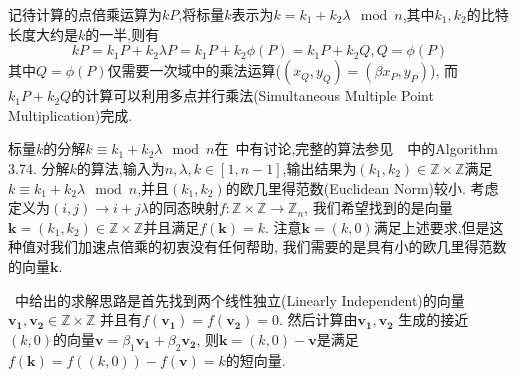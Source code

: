 \documentclass{article}
\newcommand{\Z}{\mathbb{Z}}
\begin{document}
记待计算的点倍乘运算为$kP$,将标量$k$表示为$k=k_1+k_2\lambda \mod n$,其中$k_1, k_2$的比特长度大约是$k$的一半,则有
$$kP = k_1P + k_2\lambda P = k_1P + k_2\phi(P) = k_1 P + k_2 Q, Q = \phi(P)$$
其中$Q=\phi(P)$仅需要一次域中的乘法运算($(x_Q, y_Q) = (\beta x_P, y_P)$),
而$k_1 P + k_2 Q$的计算可以利用多点并行乘法(Simultaneous Multiple Point Multiplication)完成.

标量$k$的分解$k \equiv k_1+k_2\lambda \mod n$在~\cite{glv01}中有讨论,完整的算法参见~\cite{guidetoecc}~中的Algorithm 3.74.
分解$k$的算法,输入为$n, \lambda, k\in [1, n-1]$,输出结果为$(k_1, k_2) \in \Z \times \Z$满足
$k \equiv k_1 + k_2 \lambda \mod n$,并且$(k_1, k_2)$的欧几里得范数(Euclidean Norm)较小.
考虑定义为$(i,j) \rightarrow i + j\lambda$的同态映射$f: \Z\times\Z \rightarrow \Z_n$,
我们希望找到的是向量$\mathbf{k}=(k_1, k_2)\in \Z\times\Z$并且满足$f(\mathbf{k})= k$.
注意$\mathbf{k} = (k, 0)$满足上述要求,但是这种值对我们加速点倍乘的初衷没有任何帮助,
我们需要的是具有小的欧几里得范数的向量$\mathbf{k}$.

~\cite{glv01}中给出的求解思路是首先找到两个线性独立(Linearly Independent)的向量$\mathbf{v_1}, \mathbf{v_2} \in \Z \times \Z$
并且有$f(\mathbf{v_1}) = f(\mathbf{v_2}) = 0$. 然后计算由$\mathbf{v_1}, \mathbf{v_2}$
生成的接近$(k,0)$的向量$\mathbf{v} = \beta_1\mathbf{v_1} + \beta_2\mathbf{v_2}$,
则$\mathbf{k} = (k,0) - \mathbf{v}$是满足$f(\mathbf{k}) = f((k,0)) - f(\mathbf{v}) = k$的短向量.
\end{document}
